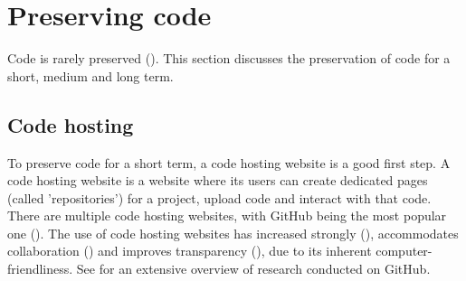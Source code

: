 \section{Preserving code}

Code is rarely preserved (\cite{barnes2010publish}).
This section discusses the preservation of code for a short, medium
and long term.

\subsection{Code hosting}\label{subsec:code-hosting}

To preserve code for a short term, 
a code hosting website is a good first step.
A code hosting website is a website where 
its users can create dedicated pages (called 'repositories')
for a project, upload code and interact with that code.
There are multiple code hosting websites, 
with GitHub being the most popular one (\cite{cosentino2017systematic}).
The use of code hosting websites
has increased strongly (\cite{russell2018large}),
accommodates collaboration (\cite{perez2016ten})
and improves transparency (\cite{gorgolewski2016practical}),
due to its inherent computer-friendliness.
See \cite{cosentino2017systematic} for an extensive overview of
research conducted on GitHub.

